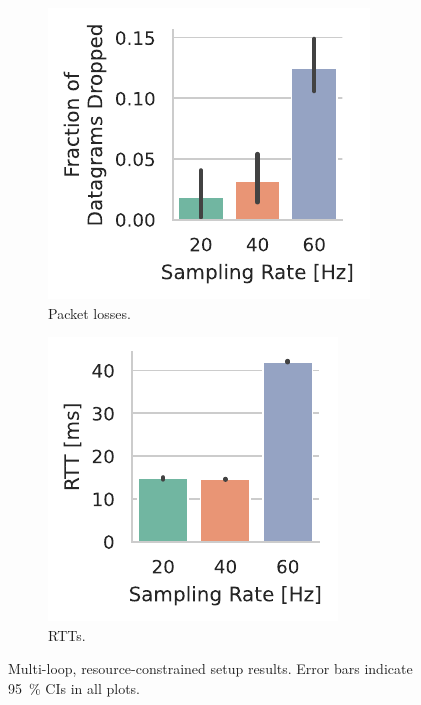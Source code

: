 \begin{figure}[t]
    \begin{subfigure}[h]{.5\textwidth}
        \centering
        \includegraphics[width=.8\textwidth]{publications/2022CLEAVE/plots/fixed_video_drop_frac}
        \caption{Packet losses.}\label{paper:olguinmunoz2022cleave:fig:video:drop}
    \end{subfigure}%
    \begin{subfigure}[h]{.5\textwidth}
        \centering
        \includegraphics[width=.8\textwidth]{publications/2022CLEAVE/plots/fixed_video_rtt}
        \caption{\glspl{RTT}.}\label{paper:olguinmunoz2022cleave:fig:video:rtt}
    \end{subfigure}%
    \caption{
        Multi-loop, resource-constrained setup results.
        Error bars indicate \SI{95}{\percent} \glspl{CI} in all plots.
    }\label{paper:olguinmunoz2022cleave:fig:video:results}
\end{figure}

